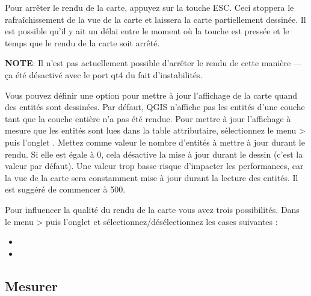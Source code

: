 Pour arrêter le rendu de la carte, appuyez sur la touche ESC. Ceci stoppera le rafraîchissement de la vue de la carte et laissera la carte partiellement dessinée. Il est possible qu'il y ait un délai entre le moment où la touche est pressée et le temps que le rendu de la carte soit arrêté.

\textbf{NOTE}: Il n'est pas actuellement possible d'arrêter le rendu de cette manière — ça été désactivé avec le port qt4 du fait d'instabilités.

\label{label_updatemap}

Vous pouvez définir une option pour mettre à jour l'affichage de la carte quand des entités sont dessinées. Par défaut, QGIS n'affiche pas les entités d'une couche tant que la couche entière n'a pas été rendue. Pour mettre à jour l'affichage à mesure que les entités sont lues dans la table attributaire, sélectionnez le menu  >  puis l'onglet . Mettez comme valeur le nombre d'entités à mettre à jour durant le rendu. Si elle est égale à 0, cela désactive la mise à jour durant le dessin (c'est la valeur par défaut). Une valeur trop basse risque d'impacter les performances, car la vue de la carte sera constamment mise à jour durant la lecture des entités. Il est suggéré de commencer à 500.

\label{label_renderquality}

Pour influencer la qualité du rendu de la carte vous avez trois possibilités. Dans le menu  >  puis l'onglet  et sélectionnez/désélectionnez les cases suivantes :

\begin{itemize}
\item {}
\item {}
\end{itemize}

\subsection{Mesurer}\label{sec:measure}

